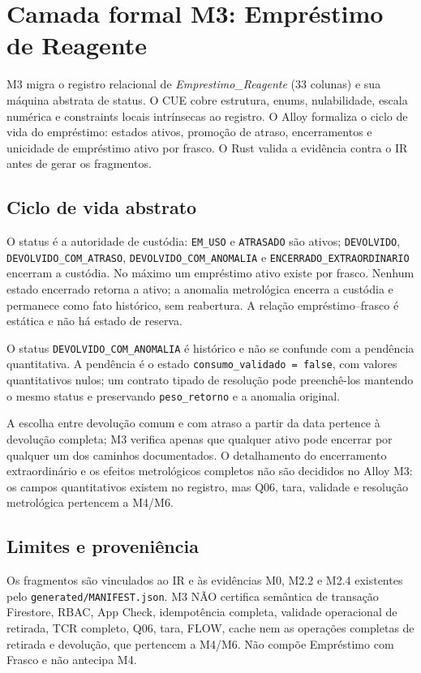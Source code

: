 \clearpage
\section{Camada formal M3: Empréstimo de Reagente}
\label{sec:formal-m3}
M3 migra o registro relacional de \textit{Emprestimo\_Reagente} (33 colunas) e
sua máquina abstrata de status. O CUE cobre estrutura, enums, nulabilidade,
escala numérica e constraints locais intrínsecas ao registro. O Alloy formaliza
o ciclo de vida do empréstimo: estados ativos, promoção de atraso, encerramentos
e unicidade de empréstimo ativo por frasco. O Rust valida a evidência contra o
IR antes de gerar os fragmentos.



\clearpage
\subsection*{Ciclo de vida abstrato}
O status é a autoridade de custódia: \texttt{EM\_USO} e \texttt{ATRASADO} são
ativos; \texttt{DEVOLVIDO}, \texttt{DEVOLVIDO\_COM\_ATRASO},
\texttt{DEVOLVIDO\_COM\_ANOMALIA} e \texttt{ENCERRADO\_EXTRAORDINARIO} encerram
a custódia. No máximo um empréstimo ativo existe por frasco. Nenhum estado
encerrado retorna a ativo; a anomalia metrológica encerra a custódia e permanece
como fato histórico, sem reabertura. A relação empréstimo--frasco é estática e
não há estado de reserva.

O status \texttt{DEVOLVIDO\_COM\_ANOMALIA} é histórico e não se confunde com a
pendência quantitativa. A pendência é o estado \texttt{consumo\_validado = false},
com valores quantitativos nulos; um contrato tipado de resolução pode preenchê-los
mantendo o mesmo status e preservando \texttt{peso\_retorno} e a anomalia original.

A escolha entre devolução comum e com atraso a partir da data pertence à
devolução completa; M3 verifica apenas que qualquer ativo pode encerrar por
qualquer um dos caminhos documentados. O detalhamento do encerramento
extraordinário e os efeitos metrológicos completos não são decididos no Alloy
M3: os campos quantitativos existem no registro, mas Q06, tara, validade e
resolução metrológica pertencem a M4/M6.

\begingroup
\small
\raggedright

\par
\endgroup

\subsection*{Limites e proveniência}
Os fragmentos são vinculados ao IR e às evidências M0, M2.2 e M2.4 existentes
pelo \texttt{generated/MANIFEST.json}. M3 NÃO certifica semântica de transação
Firestore, RBAC, App Check, idempotência completa, validade operacional de
retirada, TCR completo, Q06, tara, FLOW, cache nem as operações completas de
retirada e devolução, que pertencem a M4/M6. Não compõe Empréstimo com Frasco e
não antecipa M4.
\par
